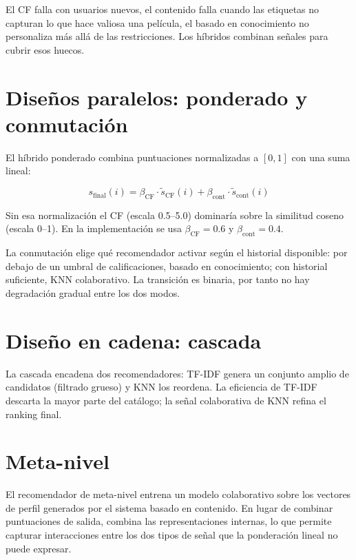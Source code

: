 El CF falla con usuarios nuevos, el contenido falla cuando las etiquetas no capturan lo que hace valiosa una película, el basado en conocimiento no personaliza más allá de las restricciones. Los híbridos combinan señales para cubrir esos huecos.

\section{Diseños paralelos: ponderado y conmutación}

El híbrido ponderado combina puntuaciones normalizadas a $[0,1]$ con una suma lineal:

\begin{equation}
    s_{\mathrm{final}}(i) = \beta_{\mathrm{CF}} \cdot \tilde{s}_{\mathrm{CF}}(i)
                          + \beta_{\mathrm{cont}} \cdot \tilde{s}_{\mathrm{cont}}(i)
\end{equation}

Sin esa normalización el CF (escala 0.5--5.0) dominaría sobre la similitud coseno (escala 0--1). En la implementación se usa $\beta_{\mathrm{CF}} = 0.6$ y $\beta_{\mathrm{cont}} = 0.4$.

La conmutación elige qué recomendador activar según el historial disponible: por debajo de un umbral de calificaciones, basado en conocimiento; con historial suficiente, KNN colaborativo. La transición es binaria, por tanto no hay degradación gradual entre los dos modos.

\section{Diseño en cadena: cascada}

La cascada encadena dos recomendadores: TF-IDF genera un conjunto amplio de candidatos (filtrado grueso) y KNN los reordena. La eficiencia de TF-IDF descarta la mayor parte del catálogo; la señal colaborativa de KNN refina el ranking final.

\section{Meta-nivel}

El recomendador de meta-nivel entrena un modelo colaborativo sobre los vectores de perfil generados por el sistema basado en contenido. En lugar de combinar puntuaciones de salida, combina las representaciones internas, lo que permite capturar interacciones entre los dos tipos de señal que la ponderación lineal no puede expresar.
